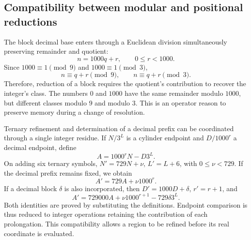 \subsection{Compatibility between modular and positional reductions}

The block decimal base enters through a Euclidean division
simultaneously preserving remainder and quotient:
\[
 n=1000q+r,\qquad 0\le r<1000.
\]
Since \(1000\equiv1\pmod9\) and \(1000\equiv1\pmod3\),
\[
 n\equiv q+r\pmod9,\qquad n\equiv q+r\pmod3.
\]
Therefore, reduction of a block requires the quotient's
contribution to recover the integer's class. The numbers \(0\) and
\(1000\) have the same remainder modulo \(1000\), but different classes
modulo \(9\) and modulo \(3\). This is an operator reason to preserve
memory during a change of resolution.

Ternary refinement and determination of a decimal prefix
can be coordinated through a single integer residue. If \(N/3^L\)
is a cylinder endpoint and \(D/1000^r\) a decimal endpoint, define
\[
 A=1000^rN-D3^L.
\]
On adding six ternary symbols, \(N'=729N+\nu\),
\(L'=L+6\), with \(0\le\nu<729\). If the decimal prefix remains
fixed, we obtain
\[
 A'=729A+\nu1000^r.
\]
If a decimal block \(\delta\) is also incorporated, then
\(D'=1000D+\delta\), \(r'=r+1\), and
\begin{equation}
 A'=729000A+\nu1000^{r+1}-729\delta3^L.
 \label{x_reciprocidad:eq:residuo-dos-bases}
\end{equation}
Both identities are proved by substituting the definitions. Endpoint
comparison is thus reduced to integer operations retaining
the contribution of each prolongation. This compatibility
allows a region to be refined before its real coordinate is evaluated.




